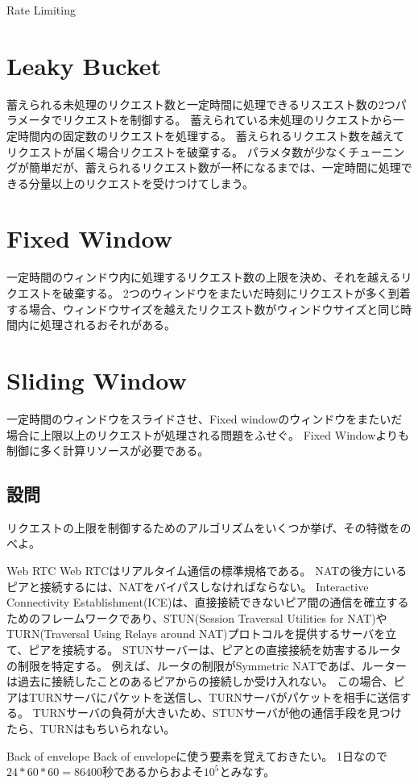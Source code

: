 \documentclass[book]{jlreq}
\begin{document}
\begin{chapter-bib}{Rate Limiting}
  \section{Leaky Bucket}
  蓄えられる未処理のリクエスト数と一定時間に処理できるリスエスト数の2つパラメータでリクエストを制御する\cite{sdi}。
  蓄えられている未処理のリクエストから一定時間内の固定数のリクエストを処理する。
  蓄えられるリクエスト数を越えてリクエストが届く場合リクエストを破棄する。
  パラメタ数が少なくチューニングが簡単だが、蓄えられるリクエスト数が一杯になるまでは、一定時間に処理できる分量以上のリクエストを受けつけてしまう。
  \section{Fixed Window}
  一定時間のウィンドウ内に処理するリクエスト数の上限を決め、それを越えるリクエストを破棄する。
  2つのウィンドウをまたいだ時刻にリクエストが多く到着する場合、ウィンドウサイズを越えたリクエスト数がウィンドウサイズと同じ時間内に処理されるおそれがある。
  \section{Sliding Window}
  一定時間のウィンドウをスライドさせ、Fixed windowのウィンドウをまたいだ場合に上限以上のリクエストが処理される問題をふせぐ。
  Fixed Windowよりも制御に多く計算リソースが必要である。
  \subsection{設問}
  \begin{exercise}
  \item リクエストの上限を制御するためのアルゴリズムをいくつか挙げ、その特徴をのべよ。
  \end{exercise}
\end{chapter-bib}
\begin{chapter-bib}{Web RTC}
  Web RTCはリアルタイム通信の標準規格である\cite{webrtc}。
  NATの後方にいるピアと接続するには、NATをバイパスしなければならない。
  Interactive Connectivity Establishment(ICE)は、直接接続できないピア間の通信を確立するためのフレームワークであり、STUN(Session Traversal Utilities for NAT)やTURN(Traversal Using Relays around NAT)プロトコルを提供するサーバを立て、ピアを接続する\cite{mdn-webrtc}。
  STUNサーバーは、ピアとの直接接続を妨害するルータの制限を特定する。
  例えば、ルータの制限がSymmetric NATであば、ルーターは過去に接続したことのあるピアからの接続しか受け入れない。
  この場合、ピアはTURNサーバにパケットを送信し、TURNサーバがパケットを相手に送信する。
  TURNサーバの負荷が大きいため、STUNサーバが他の通信手段を見つけたら、TURNはもちいられない。
\end{chapter-bib}
\begin{chapter-bib}{Back of envelope}
  Back of envelopeに使う要素を覚えておきたい。
  1日なので$24*60*60=86400$秒であるからおよそ$10^5$とみなす\cite{sdi2}。
\end{chapter-bib}
\end{document}

